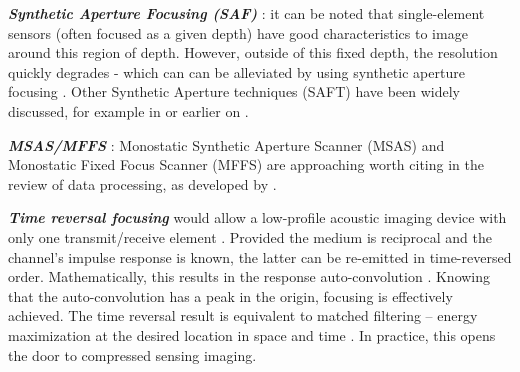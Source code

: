 \documentclass{article}
\begin{document}
\textbf{\textit{Synthetic Aperture Focusing (SAF)}} : it can be noted that single-element sensors (often focused as a given depth) have good characteristics to image around this region of depth. However, outside of this fixed depth, the resolution quickly degrades - which can can be alleviated by using synthetic aperture focusing \cite{andresen_synthetic_2011, assef_flexible_2015, li_initial_2018, lewandowski_low-cost_2012, zhang_synthetic_2016}. Other Synthetic Aperture techniques (SAFT) have been widely discussed, for example in \cite{gunarathne_strategies_2013, jeon_novel_2019} or earlier on \cite{burckhardt_experimental_1974} .

\textbf{\textit{MSAS/MFFS}} : Monostatic Synthetic Aperture Scanner (MSAS) and Monostatic Fixed Focus Scanner (MFFS) are approaching worth citing in the review of data processing, as developed by \cite{bottenus_implementation_2015, ylitalo_ultrasound_1994,heuvel_development_2017, nikolov_fast_2008}.  

\textbf{\textit{Time reversal focusing}} would allow a low-profile acoustic imaging device with only one transmit/receive element \cite{etaix_acoustic_2012}. Provided the medium is reciprocal and the channel’s impulse response is known, the latter can be re-emitted in time-reversed order. Mathematically, this results in the response auto-convolution \cite{etaix_acoustic_2012}. Knowing that the auto-convolution has a peak in the origin, focusing is effectively achieved. The time reversal result is equivalent to matched filtering – energy maximization at the desired location in space and time \cite{robin_3d_2017}. In practice, this opens the door to compressed sensing imaging.
\end{document}
